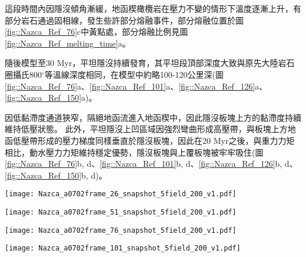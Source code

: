 這段時間內因隱沒傾角漸緩，地函楔橄欖岩在壓力不變的情形下溫度逐漸上升，有部分岩石通過固相線，發生些許部分熔融事件，部分熔融位置於圖\ref{fig::Nazca_Ref_76}c中黃點處，部分熔融比例見圖\ref{fig::Nazca_Ref_melting_time}a。

隨後模型至30 Myr，平坦隱沒持續發育，其平坦段頂部深度大致與原先大陸岩石圈攝氏800$^{\circ}$等溫線深度相同，在模型中約略100-120公里深(圖\ref{fig::Nazca_Ref_76}a、\ref{fig::Nazca_Ref_101}a、\ref{fig::Nazca_Ref_126}a、\ref{fig::Nazca_Ref_150}a)。

因低黏滯度通道狹窄，隔絕地函流進入地函楔中，因此隱沒板塊上方的黏滯度持續維持低壓狀態。
此外，平坦隱沒上凹區域因強烈彎曲形成高壓帶，與板塊上方地函低壓帶形成的壓力梯度同樣垂直於隱沒板塊，因此在20 Myr之後，與重力力矩相比，動水壓力力矩維持穩定優勢，隱沒板塊與上覆板塊被牢牢吸住(圖\ref{fig::Nazca_Ref_76}b, d、\ref{fig::Nazca_Ref_101}b, d、\ref{fig::Nazca_Ref_126}b, d、\ref{fig::Nazca_Ref_150}b, d)。


\begin{figure*}[htp]
    \centering
    \texttt{[image: Nazca\_a0702frame\_26\_snapshot\_5field\_200\_v1.pdf]}
    \caption[智利參考模型於5 Myr時之結果]{智利參考模型於5 Myr時之結果。其中(a)為岩相剖面，圖中實線為攝氏200-1200度等溫線，粉紅虛線為攝氏1330度等溫線。(b)為黏滯度剖面，(c)為密度剖面，黃點標示部分熔融位置，(d)為動水壓力剖面，(e)為應變率第二不變量。圖(b)-(e)中的灰色實線繪攝氏400$^{\circ}$、600$^{\circ}$與800$^{\circ}$等溫線。}
    \label{fig::Nazca_Ref_26}
\end{figure*}

\begin{figure*}[htp]
    \centering
    \texttt{[image: Nazca\_a0702frame\_51\_snapshot\_5field\_200\_v1.pdf]}
    \caption[智利參考模型於10 Myr時之結果]{智利參考模型於10 Myr時之結果。}
    \label{fig::Nazca_Ref_51}
\end{figure*}

\begin{figure*}[htp]
    \centering
    \texttt{[image: Nazca\_a0702frame\_76\_snapshot\_5field\_200\_v1.pdf]}
    \caption[智利參考模型於15 Myr時之結果]{智利參考模型於15 Myr時之結果。}
    \label{fig::Nazca_Ref_76}
\end{figure*}

\begin{figure*}[htp]
    \centering
    \texttt{[image: Nazca\_a0702frame\_101\_snapshot\_5field\_200\_v1.pdf]}
    \caption[智利參考模型於20 Myr時之結果]{智利參考模型於20 Myr時之結果。}
    \label{fig::Nazca_Ref_101}
\end{figure*}

